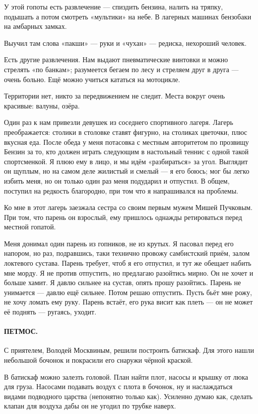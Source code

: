 \documentclass{book}
\begin{document}
У этой гопоты есть развлечение --- спиздить бензина, налить на тряпку, подышать а потом смотреть «мультики» на небе.
В лагерных машинах бензобаки на амбарных замках.

Выучил там слова «пакши» --- руки и «чухан» --- редиска, нехороший человек.

Есть другие развлечения.
Нам выдают пневматические винтовки и можно стрелять «по банкам»;
разумеется бегаем по лесу и стреляем друг в друга --- очень больно.
Ещё можно учиться кататься на мотоцикле.

Территории нет, никто за передвижением не следит.
Места вокруг очень красивые: валуны, озёра.

Один раз к нам привезли девушек из соседнего спортивного лагеря.
Лагерь преображается: столики в столовке ставят фигурно, на столиках цветочки, плюс вкусная еда.
После обеда у меня потасовка с местным авторитетом по прозвищу Бензин за то, кто должен играть следующим в настольный теннис с одной такой спортсменкой.
Я плюю ему в лицо, и мы идём «разбираться» за угол.
Выглядит он щуплым, но на самом деле жилистый и смелый --- я его боюсь;
мог бы легко избить меня, но он только один раз меня подударил и отпустил.
В общем, поступил на редкость благородно, при том что я напрашивался на проблемы.

Ко мне в этот лагерь заезжала сестра со своим первым мужем Мишей Пучковым.
При том, что парень он взрослый, ему пришлось однажды ретироваться перед местной гопатой.

Меня донимал один парень из гопников, не из крутых.
Я пасовал перед его напором, но раз, подравшись, таки технично провожу самбистский приём, залом локтевого сустава. 
Парень требует, чтоб я его отпустил, и тут же обещает набить мне морду.
Я не против отпустить, но предлагаю разойтись мирно.
Он не хочет и больше хамит.
Я давлю сильнее на сустав, опять прошу разойтись.
Парень не унимается --- давлю ещё сильнее.
Потом решаю отпустить.
Пусть бьёт мне рожу, не хочу ломать ему руку.
Парень встаёт, его рука висит как плеть --- он не может её поднять --- ругаясь, уходит.

\paragraph{ПЕТМОС.}
С приятелем, Володей Москвиным, решили построить батискаф.
Для этого нашли небольшой бочонок и покрасили его снаружи чёрной краской.

В батискаф можно залезть головой.
План найти плот, насосы и крышку от люка для груза.
Насосами подавать воздух с плота в бочонок, ну и наслаждаться видами подводного царства (непонятно только как).
Усиленно думаю как, сделать клапан для воздуха дабы он не угодил по трубке наверх.
\end{document}
